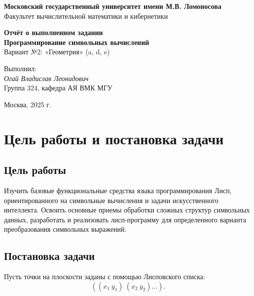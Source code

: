 \documentclass[a4paper, 11pt]{article}
\begin{document}
\begin{titlepage}
    \begin{center}
        \vspace*{0cm}

        \LARGE
        \textbf{Московский государственный университет имени М.В. Ломоносова} \\
        \Large
        Факультет вычислительной математики и кибернетики

        \vspace{6cm}

        \Huge
        \textbf{Отчёт о выполненном задании} \\
        \LARGE \textbf{Программирование символьных вычислений}\\
        \Large 
        Вариант №2: «Геометрия» (a, d, e)\\[3.0em]
        
        \vspace{0.5cm}
        
        \begin{flushright}
        Выполнил: \\
        \textit{Огай Владислав Леонидович}\\
        Группа 324, кафедра АЯ ВМК МГУ
        \end{flushright}
        \vfill

        \Large
        Москва, 2025 г. 

    \end{center}
\end{titlepage}
\tableofcontents
\newpage

\section{Цель работы и постановка задачи}

\subsection*{Цель работы}
Изучить базовые функциональные средства языка программирования Лисп,
ориентированного на символьные вычисления и задачи искусственного интеллекта.
Освоить основные приемы обработки сложных структур символьных данных,
разработать и реализовать лисп-программу для определенного варианта
преобразования символьных выражений.

\subsection*{Постановка задачи}
Пусть точки на плоскости заданы с помощью Лисповского списка:
\[
((x_1\ y_1)\ (x_2\ y_2)\dots).
\]
\end{document}
